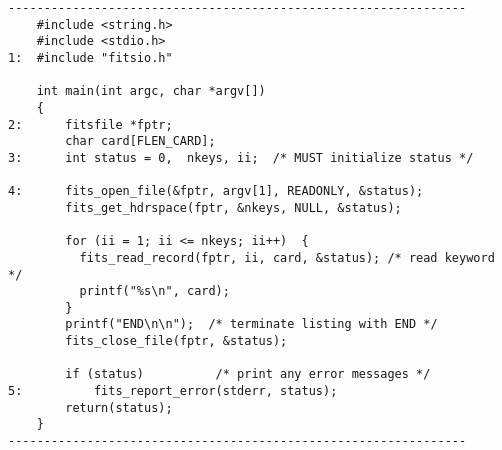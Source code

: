 \documentclass[11pt]{article}
\begin{document}
\begin{verbatim}
----------------------------------------------------------------
    #include <string.h>
    #include <stdio.h>
1:  #include "fitsio.h"

    int main(int argc, char *argv[])
    {
2:      fitsfile *fptr;         
        char card[FLEN_CARD]; 
3:      int status = 0,  nkeys, ii;  /* MUST initialize status */

4:      fits_open_file(&fptr, argv[1], READONLY, &status);
        fits_get_hdrspace(fptr, &nkeys, NULL, &status);

        for (ii = 1; ii <= nkeys; ii++)  { 
          fits_read_record(fptr, ii, card, &status); /* read keyword */
          printf("%s\n", card);
        }
        printf("END\n\n");  /* terminate listing with END */
        fits_close_file(fptr, &status);

        if (status)          /* print any error messages */
5:          fits_report_error(stderr, status);
        return(status);
    }
----------------------------------------------------------------
\end{verbatim}
\end{document}
